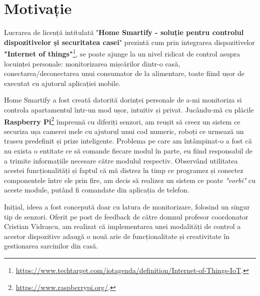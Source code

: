 \chapter*{Motivație} 

Lucrarea de licență intitulată "\textbf{Home Smartify - soluție pentru controlul dispozitivelor și securitatea casei}" prezintă cum prin integrarea dispozitivelor \textbf{"Internet of things"}\footnote{\url{https://www.techtarget.com/iotagenda/definition/Internet-of-Things-IoT}.}, se poate ajunge la un nivel ridicat de control asupra locuinței personale: monitorizarea mișcărilor dintr-o casă, conectarea/deconectarea unui consumator de la alimentare, toate fiind ușor de executat cu ajutorul aplicației mobile.

Home Smartify a fost creată datorită dorinței personale de a-mi monitoriza si controla apartamentul într-un mod ușor, intuitiv și privat. Jucându-mă cu plăcile \textbf{Raspberry Pi}\footnote{\url{https://www.raspberrypi.org/}.} împreună cu diferiți senzori, am reușit să creez un sistem ce securiza ușa camerei mele cu ajutorul unui cod numeric, roboți ce urmează un traseu predefinit și prize inteligente. Problema pe care am întâmpinat-o a fost că nu exista o entitate ce să comande fiecare modul în parte, eu fiind responsabil de a trimite informațiile necesare către modulul respectiv. Observând utilitatea acestei funcționalități și faptul că mă distrez în timp ce programez și conectez componentele între ele prin fire, am decis să realizez un sistem ce poate \emph{"vorbi"} cu aceste module, putând fi comandate din aplicația de telefon.

Inițial, ideea a fost concepută doar cu latura de monitorizare, folosind un singur tip de senzori. Oferit pe post de feedback de către domnul profesor coordonator Cristian Vidrașcu, am realizat că implementarea unei modalități de control a acestor dispozitive adaugă o nouă arie de funcționalitate și creativitate în gestionarea sarcinilor din casă.
